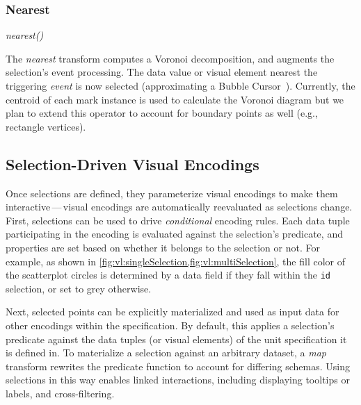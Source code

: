\vspace{-10pt}

\subsubsection{Nearest}

\vspace{-7pt}

\centerline{\emph{nearest()}}

The \emph{nearest} transform computes a Voronoi decomposition, and augments the
selection's event processing. The data value or visual element nearest the
triggering \emph{event} is now selected (approximating a Bubble
Cursor~\cite{grossman:bubble}). Currently, the centroid of each mark instance is
used to calculate the Voronoi diagram but we plan to extend this operator to
account for boundary points as well (e.g., rectangle vertices).

\vspace{-10pt}

\subsection{Selection-Driven Visual Encodings}

\vspace{-7pt}

Once selections are defined, they parameterize visual encodings to make them
interactive\,---\,visual encodings are automatically reevaluated as selections
change. First, selections can be used to drive \emph{conditional} encoding
rules. Each data tuple participating in the encoding is evaluated against the
selection's predicate, and properties are set based on whether it belongs to the
selection or not. For example, as shown in
\cref{fig:vl:singleSelection,fig:vl:multiSelection}, the fill color of the scatterplot
circles is determined by a data field if they fall within the \texttt{id}
selection, or set to grey otherwise.

Next, selected points can be explicitly materialized and used as input data for
other encodings within the specification. By default, this applies a selection's
predicate against the data tuples (or visual elements) of the unit specification
it is defined in. To materialize a selection against an arbitrary dataset, a
\emph{map} transform rewrites the predicate function to account for differing
schemas. Using selections in this way enables linked interactions, including
displaying tooltips or labels, and cross-filtering.

